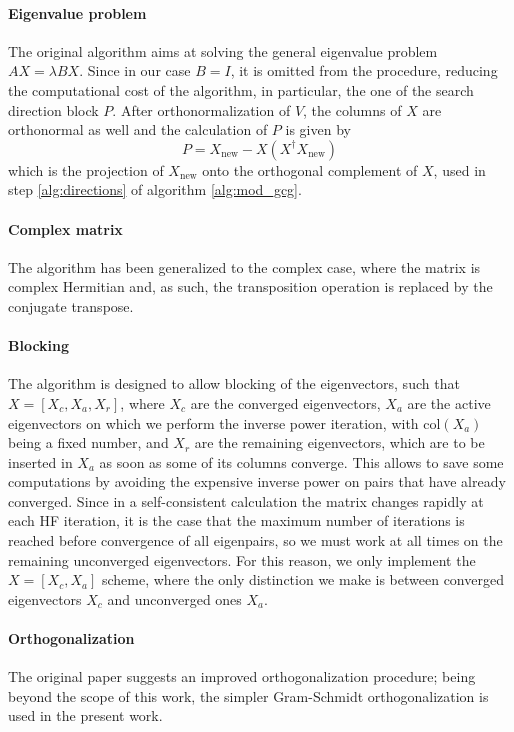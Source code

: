 \paragraph{Eigenvalue problem} The original algorithm aims at solving the general eigenvalue problem $AX = \lambda BX$. Since in our case $B=I$, it is omitted from the procedure, reducing the computational cost of the algorithm, in particular, the one of the search direction block $P$. After orthonormalization of $V$, the columns of $X$ are orthonormal as well and the calculation of $P$ is given by
\begin{equation}
    \label{eq:gcg_p}
    P = X_\text{new} - X(X^\dagger X_\text{new})
\end{equation}
which is the projection of $X_\text{new}$ onto the orthogonal complement of $X$, used in step \ref{alg:directions} of algorithm \ref{alg:mod_gcg}.
\paragraph{Complex matrix} The algorithm has been generalized to the complex case, where the matrix is complex Hermitian and, as such, the transposition operation is replaced by the conjugate transpose.
\paragraph{Blocking} The algorithm is designed to allow blocking of the eigenvectors, such that $X=[X_c, X_a, X_r]$, where $X_c$ are the converged eigenvectors, $X_a$ are the active eigenvectors on which we perform the inverse power iteration, with $\text{col}(X_a)$ being a fixed number, and $X_r$ are the remaining eigenvectors, which are to be inserted in $X_a$ as soon as some of its columns converge. This allows to save some computations by avoiding the expensive inverse power on pairs that have already converged. Since in a self-consistent calculation the matrix changes rapidly at each HF iteration, it is the case that the maximum number of iterations is reached before convergence of all eigenpairs, so we must work at all times on the remaining unconverged eigenvectors. For this reason, we only implement the $X=[X_c, X_a]$ scheme, where the only distinction we make is between converged eigenvectors $X_c$ and unconverged ones $X_a$.
\paragraph{Orthogonalization} The original paper \cite{GCG1} suggests an improved orthogonalization procedure; being beyond the scope of this work, the simpler Gram-Schmidt \cite{GM} orthogonalization is used in the present work.
